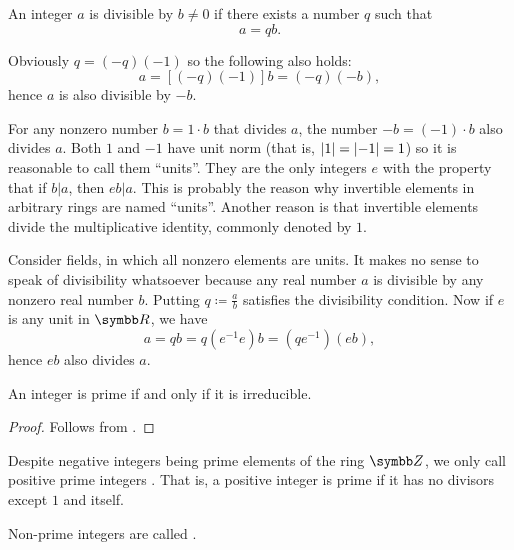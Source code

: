 \begin{remark}\label{remark:units_in_rings_etymology}
  An integer \( a \) is divisible by \( b \neq 0 \) if there exists a number \( q \) such that
  \begin{equation*}
    a = qb.
  \end{equation*}

  Obviously \( q = (-q)(-1) \) so the following also holds:
  \begin{equation*}
    a = [(-q)(-1)]b = (-q)(-b),
  \end{equation*}
  hence \( a \) is also divisible by \( -b \).

  For any nonzero number \( b = 1 \cdot b \) that divides \( a \), the number \( -b = (-1) \cdot b \) also divides \( a \). Both \( 1 \) and \( -1 \) have unit norm (that is, \( \left\vert 1 \right\vert = \left\vert -1 \right\vert = 1 \)) so it is reasonable to call them \enquote{units}. They are the only integers \( e \) with the property that if \( b | a \), then \( eb | a \). This is probably the reason why invertible elements in arbitrary rings are named \enquote{units}. Another reason is that invertible elements divide the multiplicative identity, commonly denoted by \( 1 \).

  Consider fields, in which all nonzero elements are units. It makes no sense to speak of divisibility whatsoever because any real number \( a \) is divisible by any nonzero real number \( b \). Putting \( q \coloneqq \frac a b \) satisfies the divisibility condition. Now if \( e \) is any unit in \( \BR \), we have
  \begin{equation*}
    a = qb = q(e^{-1} e) b = (qe^{-1}) (eb),
  \end{equation*}
  hence \( eb \) also divides \( a \).
\end{remark}

\begin{lemma}\label{thm:euclids_lemma}
  An integer is prime if and only if it is irreducible.
\end{lemma}
\begin{proof}
  Follows from .
\end{proof}

\begin{definition}\label{def:prime_number}
  Despite negative integers being prime elements of the ring \( \BZ \), we only call positive prime integers . That is, a positive integer is prime if it has no divisors except \( 1 \) and itself.

  Non-prime integers are called .
\end{definition}

